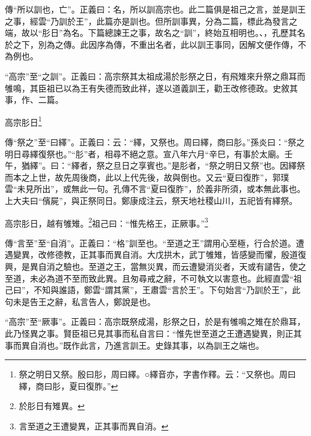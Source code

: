 {\noindent\zhuan{}\fzbyks 傳“所以訓也，亡”。正義曰：名，所以訓高宗也。此二篇俱是祖己之言，並是訓王之事，經雲“乃訓於王”，此篇亦是訓也。但所訓事異，分為二篇，標此為發言之端，故以“肜日”為名。下篇總諫王之事，故名之“訓”，終始互相明也。、，孔歷其名於之下，別為之傳。此因序為傳，不重出名者，此以訓王事同，因解文便作傳，不為例也。 \par}

{\noindent\shu{}\fzkt “高宗”至“之訓”。正義曰：高宗祭其太祖成湯於肜祭之日，有飛雉來升祭之鼎耳而雊鳴，其臣祖已以為王有失德而致此祥，遂以道義訓王，勸王改修德政。史敘其事，作、二篇。 \par}

高宗肜日\footnote{祭之明日又祭。殷曰肜，周曰繹。○繹音亦，字書作釋。云：“又祭也。周曰繹，商曰肜，夏曰復胙。”}

{\noindent\zhuan{}\fzbyks 傳“祭之”至“曰繹”。正義曰：云：“繹，又祭也。周曰繹，商曰肜。”孫炎曰：“祭之明日尋繹復祭也。”“肜”者，相尋不絕之意。宣八年六月“辛巳，有事於太廟。壬午，猶繹”。曰：“繹者，祭之旦日之享賓也。”是肜者，“祭之明日又祭”也。因繹祭而本之上世，故先周後商，此以上代先後，故與倒也。又云“夏曰復胙”，郭璞雲“未見所出”，或無此一句。孔傳不言“夏曰復胙”，於義非所須，或本無此事也。上大夫曰“儐屍”，與正祭同日。鄭康成注云，祭天地社稷山川，五祀皆有繹祭。 \par}

高宗肜日，越有雊雉。\footnote{於肜日有雉異。}祖己曰：“惟先格王，正厥事。”\footnote{言至道之王遭變異，正其事而異自消。}


{\noindent\zhuan{}\fzbyks 傳“言至”至“自消”。正義曰：“格”訓至也。“至道之王”謂用心至極，行合於道。遭遇變異，改修德教，正其事而異自消。大戊拱木，武丁雊雉，皆感變而懼，殷道復興，是異自消之驗也。至道之王，當無災異，而云遭變消災者，天或有譴告，使之至道，未必為道不至而致此異。且匆尋戒之辭，不可執文以害意也。此經直雲“祖己曰”，不知與誰語，鄭雲“謂其黨”，王肅雲“言於王”。下句始言“乃訓於王”，此句未是告王之辭，私言告人，鄭說是也。 \par}

{\noindent\shu{}\fzkt “高宗”至“厥事”。正義曰：高宗既祭成湯，肜祭之日，於是有雊鳴之雉在於鼎耳，此乃怪異之事。賢臣祖已見其事而私自言曰：“惟先世至道之王遭遇變異，則正其事而異自消也。”既作此言，乃進言訓王。史錄其事，以為訓王之端也。 \par}

